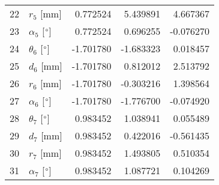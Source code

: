 \documentclass{standalone}%
\begin{document}
\begin{tabular}{llrrr}
22 &              $r_{5}$ [mm] &  0.772524 &   5.439891 &   4.667367 \\
23 &  $\alpha_{5}$ [$\degree$] &  0.772524 &   0.696255 &  -0.076270 \\
24 &  $\theta_{6}$ [$\degree$] & -1.701780 &  -1.683323 &   0.018457 \\
25 &              $d_{6}$ [mm] & -1.701780 &   0.812012 &   2.513792 \\
26 &              $r_{6}$ [mm] & -1.701780 &  -0.303216 &   1.398564 \\
27 &  $\alpha_{6}$ [$\degree$] & -1.701780 &  -1.776700 &  -0.074920 \\
28 &  $\theta_{7}$ [$\degree$] &  0.983452 &   1.038941 &   0.055489 \\
29 &              $d_{7}$ [mm] &  0.983452 &   0.422016 &  -0.561435 \\
30 &              $r_{7}$ [mm] &  0.983452 &   1.493805 &   0.510354 \\
31 &  $\alpha_{7}$ [$\degree$] &  0.983452 &   1.087721 &   0.104269 \\
\bottomrule
\end{tabular}
%
\end{document}
